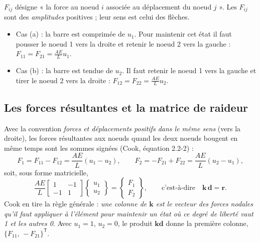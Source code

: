 \documentclass[11pt,a4paper]{article}
\begin{document}
$F_{ij}$ désigne « la force au noeud $i$ associée au déplacement du noeud $j$ ». Les $F_{ij}$
sont des \emph{amplitudes} positives ; leur sens est celui des flèches.
\begin{itemize}[nosep]
  \item Cas (a) : la barre est comprimée de $u_1$. Pour maintenir cet état il faut pousser le
        noeud 1 vers la droite et retenir le noeud 2 vers la gauche :
        $F_{11} = F_{21} = \frac{AE}{L}u_1$.
  \item Cas (b) : la barre est tendue de $u_2$. Il faut retenir le noeud 1 vers la gauche et
        tirer le noeud 2 vers la droite : $F_{12} = F_{22} = \frac{AE}{L}u_2$.
\end{itemize}

\subsection{Les forces résultantes et la matrice de raideur}
Avec la convention \emph{forces et déplacements positifs dans le même sens} (vers la droite),
les forces résultantes aux noeuds quand les deux noeuds bougent en même temps sont les sommes
signées (Cook, équation 2.2-2) :
\begin{equation}
  F_1 = F_{11} - F_{12} = \frac{AE}{L}(u_1 - u_2),\qquad
  F_2 = -F_{21} + F_{22} = \frac{AE}{L}(u_2 - u_1),
\end{equation}
soit, sous forme matricielle,
\begin{equation}
  \frac{AE}{L}\begin{bmatrix}1 & -1\\ -1 & 1\end{bmatrix}
  \begin{Bmatrix}u_1\\u_2\end{Bmatrix} = \begin{Bmatrix}F_1\\F_2\end{Bmatrix},
  \qquad\text{c'est-à-dire}\quad \mathbf k\,\mathbf d = \mathbf r .
\end{equation}
Cook en tire la règle générale : \emph{une colonne de $\mathbf k$ est le vecteur des forces
nodales qu'il faut appliquer à l'élément pour maintenir un état où ce degré de liberté vaut 1
et les autres 0}. Avec $u_1 = 1$, $u_2 = 0$, le produit $\mathbf k\mathbf d$ donne la première
colonne, $\{F_{11},\,-F_{21}\}^{\mathsf T}$.
\end{document}
